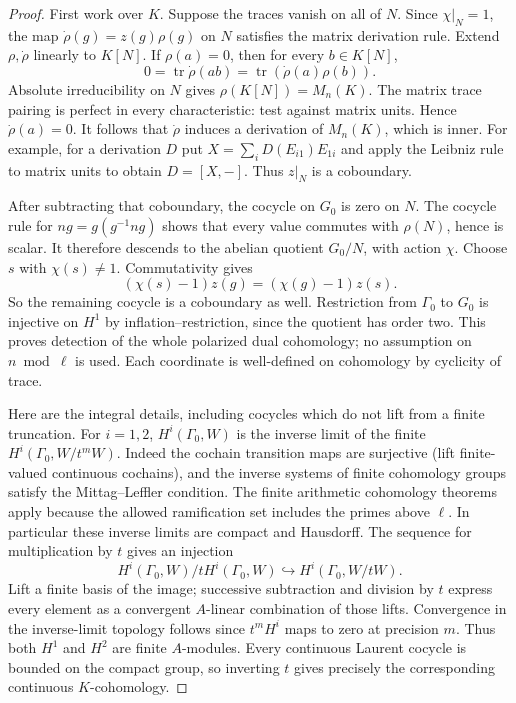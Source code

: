 \begin{proof}
First work over $K$. Suppose the traces vanish on all of $N$.
Since $\chi|_N=1$, the map
$\dot\rho(g)=z(g)\rho(g)$ on $N$ satisfies the matrix derivation
rule. Extend $\rho,\dot\rho$ linearly to $K[N]$. If $\rho(a)=0$,
then for every $b\in K[N]$,
\[
 0=\operatorname{tr}\dot\rho(ab)
   =\operatorname{tr}(\dot\rho(a)\rho(b)).
\]
Absolute irreducibility on $N$ gives $\rho(K[N])=M_n(K)$.
The matrix trace pairing is perfect in every characteristic:
test against matrix units. Hence $\dot\rho(a)=0$. It follows
that $\dot\rho$ induces a derivation of $M_n(K)$, which is inner.
For example, for a derivation $D$ put
$X=\sum_i D(E_{i1})E_{1i}$ and apply the Leibniz rule to matrix
units to obtain $D=[X,-]$. Thus $z|_N$ is a coboundary.

After subtracting that coboundary, the cocycle on $G_0$ is zero
on $N$. The cocycle rule for $ng=g(g^{-1}ng)$ shows that every
value commutes with $\rho(N)$, hence is scalar. It therefore
descends to the abelian quotient $G_0/N$, with action $\chi$.
Choose $s$ with $\chi(s)\ne1$. Commutativity gives
\[
 (\chi(s)-1)z(g)=(\chi(g)-1)z(s).
\]
So the remaining cocycle is a coboundary as well.
Restriction from $\Gamma_0$ to $G_0$ is injective on $H^1$ by
inflation--restriction, since the quotient has order two.
This proves detection of the whole polarized dual cohomology;
no assumption on $n\bmod\ell$ is used. Each coordinate is
well-defined on cohomology by cyclicity of trace.

Here are the integral details, including cocycles which do not
lift from a finite truncation. For $i=1,2$,
$H^i(\Gamma_0,W)$ is the inverse limit of the finite
$H^i(\Gamma_0,W/t^mW)$. Indeed the cochain transition maps are
surjective (lift finite-valued continuous cochains), and the
inverse systems of finite cohomology groups satisfy the
Mittag--Leffler condition. The finite arithmetic cohomology
theorems apply because the allowed ramification set includes
the primes above $\ell$. In particular these inverse limits
are compact and Hausdorff. The sequence for multiplication by
$t$ gives an injection
\[
 H^i(\Gamma_0,W)/tH^i(\Gamma_0,W)
       \hookrightarrow H^i(\Gamma_0,W/tW).
\]
Lift a finite basis of the image; successive subtraction and
division by $t$ express every element as a convergent
$A$-linear combination of those lifts. Convergence in the
inverse-limit topology follows since $t^mH^i$ maps to zero at
precision $m$. Thus both $H^1$ and $H^2$ are finite $A$-modules.
Every continuous Laurent cocycle is bounded on the compact
group, so inverting $t$ gives precisely the corresponding
continuous $K$-cohomology.


\end{proof}

